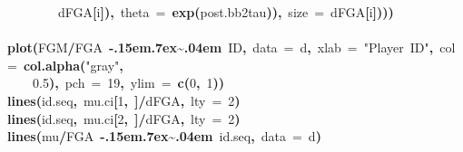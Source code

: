 \documentclass{article}
\makeatletter
\newcommand{\hlnumber}[1]{\textcolor[rgb]{0,0,0}{#1}}%
\newcommand{\hlfunctioncall}[1]{\textcolor[rgb]{.5,0,.33}{\textbf{#1}}}%
\newcommand{\hlstring}[1]{\textcolor[rgb]{.6,.6,1}{#1}}%
\newcommand{\hlkeyword}[1]{\textbf{#1}}%
\newcommand{\hlargument}[1]{\textcolor[rgb]{.69,.25,.02}{#1}}%
\newcommand{\hlsymbol}[1]{#1}%
\def\urltilda{\kern -.15em\lower .7ex\hbox{\~{}}\kern .04em}%
\newcommand{\hlstd}[1]{\textcolor[rgb]{0,0,0}{#1}}%
\newenvironment{kframe}{%
 \def\FrameCommand##1{\hskip\@totalleftmargin \hskip-\fboxsep
 \colorbox{shadecolor}{##1}\hskip-\fboxsep
     \hskip-\linewidth \hskip-\@totalleftmargin \hskip\columnwidth}%
 \MakeFramed {\advance\hsize-\width
   \@totalleftmargin\z@ \linewidth\hsize
   \@setminipage}}%
 {\par\unskip\endMakeFramed}
\newenvironment{knitrout}{}{} %
\makeatother
\begin{document}
\begin{knitrout}
{\begin{kframe}
\begin{flushleft}
\hlstd{}{\ }{\ }{\ }{\ }{\ }{\ }{\ }{\ }\hlsymbol{d}\hlkeyword{\usebox{\hlnormalsizeboxdollar}}\hlsymbol{FGA}\hlkeyword{[}\hlsymbol{i}\hlkeyword{]}\hlkeyword{)}\hlkeyword{,}{\ }\hlargument{theta}{\ }\hlargument{=}{\ }\hlfunctioncall{exp}\hlkeyword{(}\hlsymbol{post.bb2}\hlkeyword{\usebox{\hlnormalsizeboxdollar}}\hlsymbol{tau}\hlkeyword{)}\hlkeyword{)}\hlkeyword{,}{\ }\hlargument{size}{\ }\hlargument{=}{\ }\hlsymbol{d}\hlkeyword{\usebox{\hlnormalsizeboxdollar}}\hlsymbol{FGA}\hlkeyword{[}\hlsymbol{i}\hlkeyword{]}\hlkeyword{)}\hlkeyword{)}\hlkeyword{)}\hspace*{\fill}\\
\hlstd{}\hspace*{\fill}\\
\hlstd{}\hlfunctioncall{plot}\hlkeyword{(}\hlsymbol{FGM}\hlkeyword{/}\hlsymbol{FGA}{\ }\hlkeyword{\urltilda{}}{\ }\hlsymbol{ID}\hlkeyword{,}{\ }\hlargument{data}{\ }\hlargument{=}{\ }\hlsymbol{d}\hlkeyword{,}{\ }\hlargument{xlab}{\ }\hlargument{=}{\ }\hlstring{"Player{\ }ID"}\hlkeyword{,}{\ }\hlargument{col}{\ }\hlargument{=}{\ }\hlfunctioncall{col.alpha}\hlkeyword{(}\hlstring{"gray"}\hlkeyword{,}\hspace*{\fill}\\
\hlstd{}{\ }{\ }{\ }{\ }\hlnumber{0.5}\hlkeyword{)}\hlkeyword{,}{\ }\hlargument{pch}{\ }\hlargument{=}{\ }\hlnumber{19}\hlkeyword{,}{\ }\hlargument{ylim}{\ }\hlargument{=}{\ }\hlfunctioncall{c}\hlkeyword{(}\hlnumber{0}\hlkeyword{,}{\ }\hlnumber{1}\hlkeyword{)}\hlkeyword{)}\hspace*{\fill}\\
\hlstd{}\hlfunctioncall{lines}\hlkeyword{(}\hlsymbol{id.seq}\hlkeyword{,}{\ }\hlsymbol{mu.ci}\hlkeyword{[}\hlnumber{1}\hlkeyword{,}{\ }\hlkeyword{]}\hlkeyword{/}\hlsymbol{d}\hlkeyword{\usebox{\hlnormalsizeboxdollar}}\hlsymbol{FGA}\hlkeyword{,}{\ }\hlargument{lty}{\ }\hlargument{=}{\ }\hlnumber{2}\hlkeyword{)}\hspace*{\fill}\\
\hlstd{}\hlfunctioncall{lines}\hlkeyword{(}\hlsymbol{id.seq}\hlkeyword{,}{\ }\hlsymbol{mu.ci}\hlkeyword{[}\hlnumber{2}\hlkeyword{,}{\ }\hlkeyword{]}\hlkeyword{/}\hlsymbol{d}\hlkeyword{\usebox{\hlnormalsizeboxdollar}}\hlsymbol{FGA}\hlkeyword{,}{\ }\hlargument{lty}{\ }\hlargument{=}{\ }\hlnumber{2}\hlkeyword{)}\hspace*{\fill}\\
\hlstd{}\hlfunctioncall{lines}\hlkeyword{(}\hlsymbol{mu}\hlkeyword{/}\hlsymbol{FGA}{\ }\hlkeyword{\urltilda{}}{\ }\hlsymbol{id.seq}\hlkeyword{,}{\ }\hlargument{data}{\ }\hlargument{=}{\ }\hlsymbol{d}\hlkeyword{)}\mbox{}

\end{flushleft}
\end{kframe}}
\end{knitrout}
\end{document}
